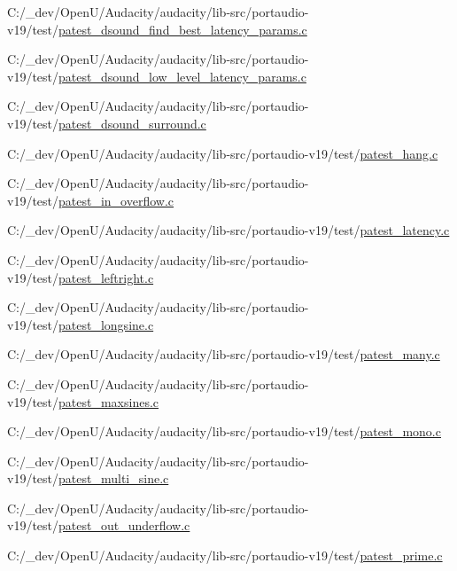 \begin{DoxyCompactItemize}
C\+:/\+\_\+dev/\+Open\+U/\+Audacity/audacity/lib-\/src/portaudio-\/v19/test/\hyperlink{patest__dsound__find__best__latency__params_8c}{patest\+\_\+dsound\+\_\+find\+\_\+best\+\_\+latency\+\_\+params.\+c}\item 
C\+:/\+\_\+dev/\+Open\+U/\+Audacity/audacity/lib-\/src/portaudio-\/v19/test/\hyperlink{patest__dsound__low__level__latency__params_8c}{patest\+\_\+dsound\+\_\+low\+\_\+level\+\_\+latency\+\_\+params.\+c}\item 
C\+:/\+\_\+dev/\+Open\+U/\+Audacity/audacity/lib-\/src/portaudio-\/v19/test/\hyperlink{patest__dsound__surround_8c}{patest\+\_\+dsound\+\_\+surround.\+c}\item 
C\+:/\+\_\+dev/\+Open\+U/\+Audacity/audacity/lib-\/src/portaudio-\/v19/test/\hyperlink{patest__hang_8c}{patest\+\_\+hang.\+c}\item 
C\+:/\+\_\+dev/\+Open\+U/\+Audacity/audacity/lib-\/src/portaudio-\/v19/test/\hyperlink{patest__in__overflow_8c}{patest\+\_\+in\+\_\+overflow.\+c}\item 
C\+:/\+\_\+dev/\+Open\+U/\+Audacity/audacity/lib-\/src/portaudio-\/v19/test/\hyperlink{patest__latency_8c}{patest\+\_\+latency.\+c}\item 
C\+:/\+\_\+dev/\+Open\+U/\+Audacity/audacity/lib-\/src/portaudio-\/v19/test/\hyperlink{patest__leftright_8c}{patest\+\_\+leftright.\+c}\item 
C\+:/\+\_\+dev/\+Open\+U/\+Audacity/audacity/lib-\/src/portaudio-\/v19/test/\hyperlink{patest__longsine_8c}{patest\+\_\+longsine.\+c}\item 
C\+:/\+\_\+dev/\+Open\+U/\+Audacity/audacity/lib-\/src/portaudio-\/v19/test/\hyperlink{patest__many_8c}{patest\+\_\+many.\+c}\item 
C\+:/\+\_\+dev/\+Open\+U/\+Audacity/audacity/lib-\/src/portaudio-\/v19/test/\hyperlink{patest__maxsines_8c}{patest\+\_\+maxsines.\+c}\item 
C\+:/\+\_\+dev/\+Open\+U/\+Audacity/audacity/lib-\/src/portaudio-\/v19/test/\hyperlink{patest__mono_8c}{patest\+\_\+mono.\+c}\item 
C\+:/\+\_\+dev/\+Open\+U/\+Audacity/audacity/lib-\/src/portaudio-\/v19/test/\hyperlink{patest__multi__sine_8c}{patest\+\_\+multi\+\_\+sine.\+c}\item 
C\+:/\+\_\+dev/\+Open\+U/\+Audacity/audacity/lib-\/src/portaudio-\/v19/test/\hyperlink{patest__out__underflow_8c}{patest\+\_\+out\+\_\+underflow.\+c}\item 
C\+:/\+\_\+dev/\+Open\+U/\+Audacity/audacity/lib-\/src/portaudio-\/v19/test/\hyperlink{patest__prime_8c}{patest\+\_\+prime.\+c}\item 

\end{DoxyCompactItemize}
